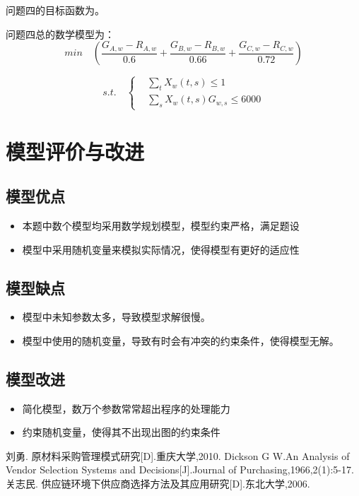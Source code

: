 \documentclass[withoutpreface,bwprint]{cumcmthesis} %
\begin{document}

问题四的目标函数为\cite{eq:yue5}。

问题四总的数学模型为：
\[
min \quad (\frac{G_{A,w}-R_{A,w}}{0.6}+\frac{G_{B,w}-R_{B,w}}{0.66}+\frac{G_{C,w}-R_{C,w}}{0.72})
\]

$$ s.t. \quad \left\{
\begin{aligned}
    & \sum\limits_t X_w(t,s)\le 1 \\
    & \sum\limits_s X_w(t,s)G_{w,s}\le 6000
\end{aligned}
\right.
$$

\section{模型评价与改进}

\subsection{模型优点}
\begin{itemize}
    \item 本题中数个模型均采用数学规划模型，模型约束严格，满足题设
    \item 模型中采用随机变量来模拟实际情况，使得模型有更好的适应性
\end{itemize}
\subsection{模型缺点}
\begin{itemize}
    \item 模型中未知参数太多，导致模型求解很慢。
    \item 模型中使用的随机变量，导致有时会有冲突的约束条件，使得模型无解。
\end{itemize}
\subsection{模型改进}
\begin{itemize}
    \item 简化模型，数万个参数常常超出程序的处理能力
    \item 约束随机变量，使得其不出现出图的约束条件
\end{itemize}



\begin{thebibliography}{9}%
  刘勇. 原材料采购管理模式研究[D].重庆大学,2010.
  Dickson G W.An Analysis of Vendor Selection Systems and Decisions[J].Journal of Purchasing,1966,2(1):5-17.
  关志民. 供应链环境下供应商选择方法及其应用研究[D].东北大学,2006.
\end{thebibliography}
\end{document}
